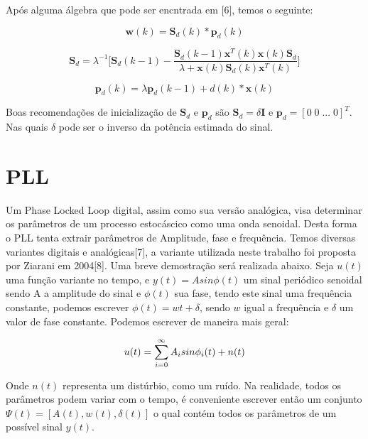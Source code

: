 \documentclass[a4paper, 12pt]{book}
\begin{document}
\indent Após alguma álgebra que pode ser encntrada em [6], temos o seguinte:

\Large
\begin{equation}
\boldsymbol{w}(k)=\boldsymbol{S}_d(k)*\boldsymbol{p}_d(k)
\end{equation}


\begin{equation}
\boldsymbol{S}_d=\lambda^{-1}\Bigg[\boldsymbol{S}_d(k-1)-\frac{\boldsymbol{S}_d(k-1)\boldsymbol{x}^T(k)\boldsymbol{x}(k)\boldsymbol{S}_d}{\lambda+\boldsymbol{x}(k)\boldsymbol{S}_d(k)\boldsymbol{x}^T(k)}\Bigg]
\end{equation}

\begin{equation}
\boldsymbol{p}_d(k)=\lambda \boldsymbol{p}_d(k-1)+d(k)*\boldsymbol{x}(k)
\end{equation}
\normalsize

\indent Boas recomendações de inicialização de $\boldsymbol{S}_d$ e $\boldsymbol{p}_d$ são $\boldsymbol{S}_d=\delta \boldsymbol{I}$ e $\boldsymbol{p}_d=[0\;0\;...\;0]^{T}$. Nas quais $\delta$ pode ser o inverso da potência estimada do sinal.

\section{PLL}

\indent Um Phase Locked Loop digital, assim como sua versão analógica, visa determinar os parâmetros de um processo estocáscico como uma onda senoidal. Desta forma o PLL tenta extrair parâmetros de Amplitude, fase e frequência. Temos diversas variantes digitais e analógicas[7], a variante utilizada neste trabalho foi proposta por Ziarani em 2004[8]. Uma breve demostração será realizada abaixo.
\indent Seja $u(t)$ uma função variante no tempo, e $y(t)=Asin\phi(t)$ um sinal periódico senoidal sendo A a amplitude do sinal e $\phi(t)$ sua fase, tendo este sinal uma frequência constante, podemos escrever $\phi(t)=wt+\delta$, sendo $w$ igual a frequência e $\delta$ um valor de fase constante. Podemos escrever de maneira mais geral:

\begin{equation}
u(t)=\sum_{i=0}^{\infty}A_i sin\phi_i(t)\space+\space n(t)
\end{equation}

Onde $n(t)$ representa um distúrbio, como um ruído. Na realidade, todos os parâmetros podem variar com o tempo, é conveniente escrever então um conjunto $\Psi(t)=[A(t), w(t), \delta(t)]$ o qual contém todos os parâmetros de um possível sinal $y(t)$.
\end{document}
